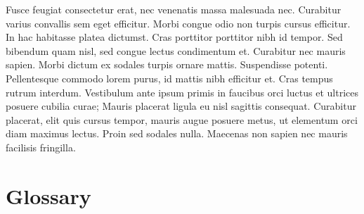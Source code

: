 \documentclass[
]{article}
\begin{document}
Fusce feugiat consectetur erat, nec venenatis massa malesuada nec. Curabitur varius convallis sem eget efficitur. Morbi congue odio non turpis cursus efficitur. In hac habitasse platea dictumst. Cras porttitor porttitor nibh id tempor. Sed bibendum quam nisl, sed congue lectus condimentum et. Curabitur nec mauris sapien. Morbi dictum ex sodales turpis ornare mattis. Suspendisse potenti. Pellentesque commodo lorem purus, id mattis nibh efficitur et. Cras tempus rutrum interdum. Vestibulum ante ipsum primis in faucibus orci luctus et ultrices posuere cubilia curae; Mauris placerat ligula eu nisl sagittis consequat. Curabitur placerat, elit quis cursus tempor, mauris augue posuere metus, ut elementum orci diam maximus lectus. Proin sed sodales nulla. Maecenas non sapien nec mauris facilisis fringilla.

\clearpage


\renewcommand*\contentsname{Table of Contents}

\thispagestyle{empty}
\begin{singlespace}
\renewcommand{\cftsecleader}{\cftdotfill{\cftdotsep}}
\setcounter{tocdepth}{3}
\tableofcontents
\clearpage
{}
{}
\listoftables
\clearpage
{}
{}
\listoffigures
\clearpage
\end{singlespace}

\section*{Glossary}
\end{document}
